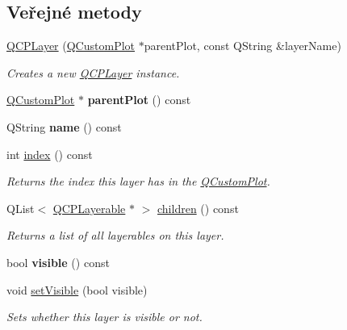 \subsection*{Veřejné metody}
\begin{DoxyCompactItemize}
\item 
\hyperlink{classQCPLayer_a5d0657fc86d624e5efbe930ef21af718}{Q\+C\+P\+Layer} (\hyperlink{classQCustomPlot}{Q\+Custom\+Plot} $\ast$parent\+Plot, const Q\+String \&layer\+Name)
\begin{DoxyCompactList}\small\item\em Creates a new \hyperlink{classQCPLayer}{Q\+C\+P\+Layer} instance. \end{DoxyCompactList}\item 
\hypertarget{classQCPLayer_a3958c9a938c2d05a7378c41484acee08}{}\hyperlink{classQCustomPlot}{Q\+Custom\+Plot} $\ast$ {\bfseries parent\+Plot} () const \label{classQCPLayer_a3958c9a938c2d05a7378c41484acee08}

\item 
\hypertarget{classQCPLayer_a96ebd1e436f3813938cb9cd4a59a60be}{}Q\+String {\bfseries name} () const \label{classQCPLayer_a96ebd1e436f3813938cb9cd4a59a60be}

\item 
int \hyperlink{classQCPLayer_ad5d7010829a6b99f326b07d7e37c8c99}{index} () const 
\begin{DoxyCompactList}\small\item\em Returns the index this layer has in the \hyperlink{classQCustomPlot}{Q\+Custom\+Plot}. \end{DoxyCompactList}\item 
Q\+List$<$ \hyperlink{classQCPLayerable}{Q\+C\+P\+Layerable} $\ast$ $>$ \hyperlink{classQCPLayer_a94c2f0100e48cefad2de8fe0fbb03c27}{children} () const 
\begin{DoxyCompactList}\small\item\em Returns a list of all layerables on this layer. \end{DoxyCompactList}\item 
\hypertarget{classQCPLayer_a9efca636e4dcad721999a6282f296016}{}bool {\bfseries visible} () const \label{classQCPLayer_a9efca636e4dcad721999a6282f296016}

\item 
void \hyperlink{classQCPLayer_ac07671f74edf6884b51a82afb2c19516}{set\+Visible} (bool visible)
\begin{DoxyCompactList}\small\item\em Sets whether this layer is visible or not. \end{DoxyCompactList}\end{DoxyCompactItemize}
